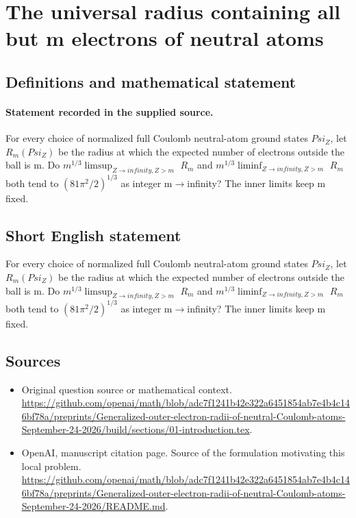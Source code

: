\documentclass[11pt]{article}
\begin{document}
\section*{The universal radius containing all but m electrons of neutral atoms}\label{statement}
\subsection{Definitions and mathematical statement}
\paragraph{Statement recorded in the supplied source.}
For every choice of normalized full Coulomb neutral-atom ground states $Psi_Z$, let $R_m(Psi_Z)$ be the radius at which the expected number of electrons outside the ball is m. Do $m^{1/3}\limsup _{Z\to infinity,Z>m}$ $R_m$ and $m^{1/3}\liminf _{Z\to infinity,Z>m}$ $R_m$ both tend to $(81\pi ^2/2)^{1/3}$ as integer m$\to$infinity? The inner limits keep m fixed.
\subsection{Short English statement}
For every choice of normalized full Coulomb neutral-atom ground states $Psi_Z$, let $R_m(Psi_Z)$ be the radius at which the expected number of electrons outside the ball is m. Do $m^{1/3}\limsup _{Z\to infinity,Z>m}$ $R_m$ and $m^{1/3}\liminf _{Z\to infinity,Z>m}$ $R_m$ both tend to $(81\pi ^2/2)^{1/3}$ as integer m$\to$infinity? The inner limits keep m fixed.
\subsection{Sources}
\begin{itemize}
\item[S1] Original question source or mathematical context.
\url{https://github.com/openai/math/blob/adc7f1241b42e322a6451854ab7e4b4c146bf78a/preprints/Generalized-outer-electron-radii-of-neutral-Coulomb-atoms-September-24-2026/build/sections/01-introduction.tex}.
\item[S2] OpenAI, manuscript citation page. Source of the formulation motivating this local problem.
\url{https://github.com/openai/math/blob/adc7f1241b42e322a6451854ab7e4b4c146bf78a/preprints/Generalized-outer-electron-radii-of-neutral-Coulomb-atoms-September-24-2026/README.md}.
\end{itemize}
\end{document}
